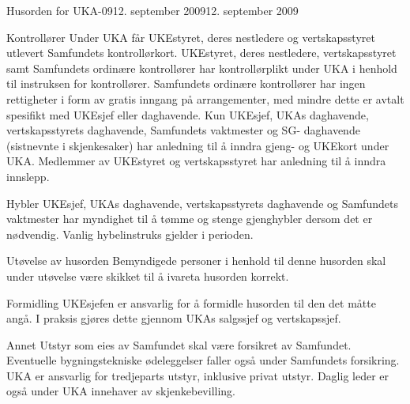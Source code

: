 \begin{instruks}{Husorden for UKA-09}{12. september 2009}{12. september 2009}
\begin{instruksledd}{Kontrollører}
Under UKA får UKEstyret, deres nestledere og vertskapsstyret utlevert Samfundets
kontrollørkort. UKEstyret, deres nestledere, vertskapsstyret samt Samfundets ordinære
kontrollører har kontrollørplikt under UKA i henhold til instruksen for kontrollører.
Samfundets ordinære kontrollører har ingen rettigheter i form av gratis inngang på
arrangementer, med mindre dette er avtalt spesifikt med UKEsjef eller daghavende. Kun
UKEsjef, UKAs daghavende, vertskapsstyrets daghavende, Samfundets vaktmester og SG-
daghavende (sistnevnte i skjenkesaker) har anledning til å inndra gjeng- og UKEkort under
UKA. Medlemmer av UKEstyret og vertskapsstyret har anledning til å inndra innslepp.
\end{instruksledd}

\begin{instruksledd}{Hybler}
UKEsjef, UKAs daghavende, vertskapsstyrets daghavende og Samfundets vaktmester har
myndighet til å tømme og stenge gjenghybler dersom det er nødvendig. Vanlig hybelinstruks
gjelder i perioden.
\end{instruksledd}

\begin{instruksledd}{Utøvelse av husorden}
Bemyndigede personer i henhold til denne husorden skal under utøvelse være skikket til å
ivareta husorden korrekt.
\end{instruksledd}

\begin{instruksledd}{Formidling}
UKEsjefen er ansvarlig for å formidle husorden til den det måtte angå. I praksis gjøres dette
gjennom UKAs salgssjef og vertskapssjef.
\end{instruksledd}

\begin{instruksledd}{Annet}
Utstyr som eies av Samfundet skal være forsikret av Samfundet. Eventuelle bygningstekniske
ødeleggelser faller også under Samfundets forsikring. UKA er ansvarlig for tredjeparts utstyr,
inklusive privat utstyr. Daglig leder er også under UKA innehaver av skjenkebevilling.
\end{instruksledd}

\end{instruks}
